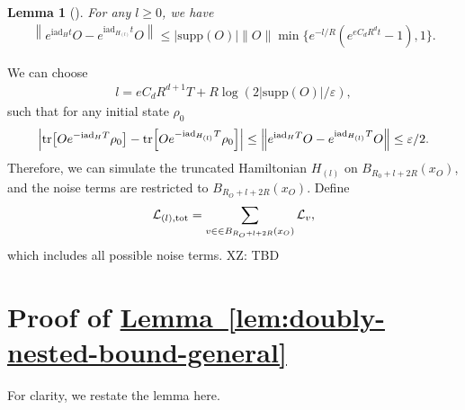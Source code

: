 \documentclass[11pt]{article}
\newtheorem{lemma}{Lemma}
\newcommand{\lem}[1]{\hyperref[lem:#1]{Lemma~\ref*{lem:#1}}}
\renewcommand{\i}{\mathrm{i}}
\renewcommand{\L}{\mathcal{L}}
\newcommand{\ad}{\mathrm{ad}}
\newcommand{\supp}{\mathrm{supp}}
\newcommand{\eps}{\varepsilon}
\newcommand{\xz}[1]{{\color{cyan} XZ: #1}}
\begin{document}
\begin{lemma}[{\cite[Lemma 2]{rao2025stability}}]
    For any $l\ge 0$, we have \begin{align*}
        \left\| e^{\i \ad_H t}O - e^{\i \ad_{H_{(l)}}t}O\right\| \le |\supp(O)|\|O\|\min\{e^{-l/R}(e^{eC_dR^d t}-1), 1\}.
    \end{align*}
\end{lemma}
We can choose \begin{align*}
    l = eC_d R^{d+1}T+ R\log(2|\supp(O)|/\eps),
\end{align*}
such that for any initial state $\rho_0$ \begin{align*}
    \left| \tr[Oe^{-\i \ad_H T}\rho_0]- \tr[Oe^{-\i \ad_{H_{(l)}} T}\rho_0]\right| \le \left\| e^{\i \ad_HT}O - e^{\i \ad_{H_{(l)}}T}O\right\| \le \eps/2.
\end{align*}
Therefore, we can simulate the truncated Hamiltonian $H_{(l)}$ on $B_{R_0+l+2R}(x_O)$,  and the noise terms are restricted to $B_{R_O+l+2R}(x_O)$. Define
\begin{align*}
     \L_{(l), \rm tot} =  \sum_{v\in \in B_{R_O+l+2R}(x_O)} \L_v,
\end{align*}
which includes all possible  noise terms. 
\xz{TBD}


\appendix

\section{Proof of \lem{doubly-nested-bound-general}}
\label{append:sec:proof-doubly-nested}

For clarity, we restate the lemma here.
\end{document}
